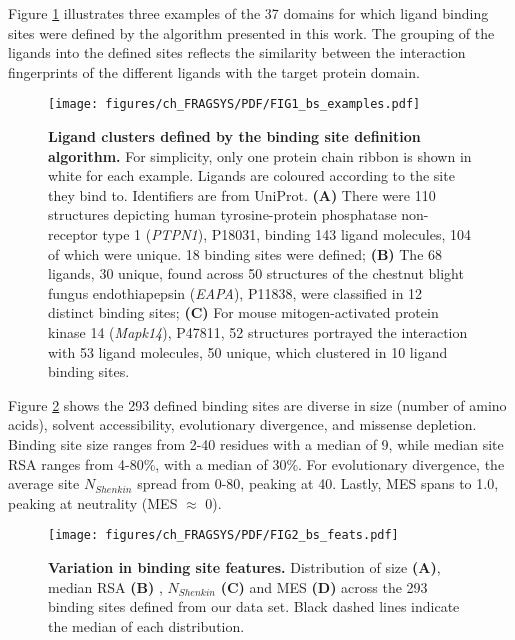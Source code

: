 Figure \ref{fig:bs_def_examples} illustrates three examples of the 37 domains for which ligand binding sites were defined by the algorithm presented in this work. The grouping of the ligands into the defined sites reflects the similarity between the interaction fingerprints of the different ligands with the target protein domain.

\begin{figure}[htbp]
    \centering
    \texttt{[image: figures/ch\_FRAGSYS/PDF/FIG1\_bs\_examples.pdf]}
    \caption[Ligand clusters defined by the binding site definition algorithm]{\textbf{Ligand clusters defined by the binding site definition algorithm.} For simplicity, only one protein chain ribbon is shown in white for each example. Ligands are coloured according to the site they bind to. Identifiers are from UniProt. \textbf{(A)} There were 110 structures depicting human tyrosine-protein phosphatase non-receptor type 1 (\textit{PTPN1}), P18031, binding 143 ligand molecules, 104 of which were unique. 18 binding sites were defined; \textbf{(B)} The 68 ligands, 30 unique, found across 50 structures of the chestnut blight fungus endothiapepsin (\textit{EAPA}), P11838, were classified in 12 distinct binding sites; \textbf{(C)} For mouse mitogen-activated protein kinase 14 (\textit{Mapk14}), P47811, 52 structures portrayed the interaction with 53 ligand molecules, 50 unique, which clustered in 10 ligand binding sites.}
    \label{fig:bs_def_examples}
\end{figure}

Figure \ref{fig:bss_features} shows the 293 defined binding sites are diverse in size (number of amino acids), solvent accessibility, evolutionary divergence, and missense depletion. Binding site size ranges from 2-40 residues with a median of 9, while median site RSA ranges from 4-80\%, with a median of 30\%. For evolutionary divergence, the average site $N_{Shenkin}$ spread from 0-80, peaking at 40. Lastly, MES spans  to 1.0, peaking at neutrality (MES $\approx$ 0).

\begin{figure}[htbp]
    \centering
    \texttt{[image: figures/ch\_FRAGSYS/PDF/FIG2\_bs\_feats.pdf]}
    \caption[Variation in binding site features]{\textbf{Variation in binding site features.} Distribution of size \textbf{(A)}, median RSA \textbf{(B)} , $N_{Shenkin}$ \textbf{(C)} and MES \textbf{(D)} across the 293 binding sites defined from our data set. Black dashed lines indicate the median of each distribution.}
    \label{fig:bss_features}
\end{figure}

